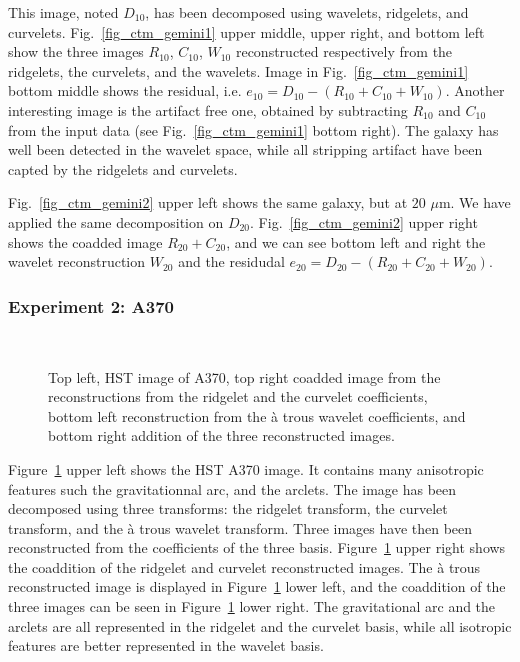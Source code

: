 This image, noted $D_{10}$, has been decomposed using wavelets, ridgelets, and curvelets.
Fig.~\ref{fig_ctm_gemini1} upper middle,  upper  right, and bottom left
show the three images $R_{10}$, $C_{10}$, $W_{10}$
reconstructed respectively from the ridgelets, the curvelets, and the wavelets.
Image in Fig.~\ref{fig_ctm_gemini1} bottom middle shows the residual, i.e.
$e_{10} = D_{10} - (R_{10} + C_{10} + W_{10})$. Another interesting
image is the artifact free one, obtained by subtracting $R_{10}$ and
$C_{10}$ from the input data (see Fig.~\ref{fig_ctm_gemini1} bottom right).
The galaxy has well been detected in the wavelet space, while all stripping
artifact have been capted by the ridgelets and curvelets.

Fig.~\ref{fig_ctm_gemini2} upper left shows the same galaxy, but at
$20$ $\mu$m. We have applied the same decomposition on $D_{20}$. 
Fig.~\ref{fig_ctm_gemini2} upper right shows the coadded 
image $R_{20} + C_{20}$, and we can see bottom left and right the 
wavelet reconstruction $W_{20}$ and the residudal
$e_{20} = D_{20} - (R_{20} + C_{20} + W_{20})$.

\subsubsection{Experiment 2: A370}
 
\begin{figure}[htb]
\centerline{
\vbox{
\hbox{
}
\hbox{
}
}}
\caption{Top left, HST image of A370, top right coadded image from the
reconstructions from the ridgelet and the curvelet coefficients, bottom
left  reconstruction from  the \`a trous wavelet coefficients, 
and bottom right addition of the three reconstructed images. }
\label{fig_a370}
\end{figure}

Figure~\ref{fig_a370} upper left shows the HST A370 image. It contains many 
anisotropic features such the gravitationnal arc, and the arclets. The
image has been decomposed using three transforms: the ridgelet transform, 
the curvelet transform, and the \`a trous wavelet transform. Three images
have then been reconstructed from the coefficients of the three basis.
Figure~\ref{fig_a370} upper right shows the coaddition of the ridgelet 
and curvelet reconstructed images. The \`a trous reconstructed image
is displayed in Figure~\ref{fig_a370} lower left, and the coaddition 
of the three images can be seen in Figure~\ref{fig_a370} lower right.
The gravitational arc and the arclets are all represented in the 
ridgelet and the curvelet basis, while all isotropic features are 
better represented in the wavelet basis.

